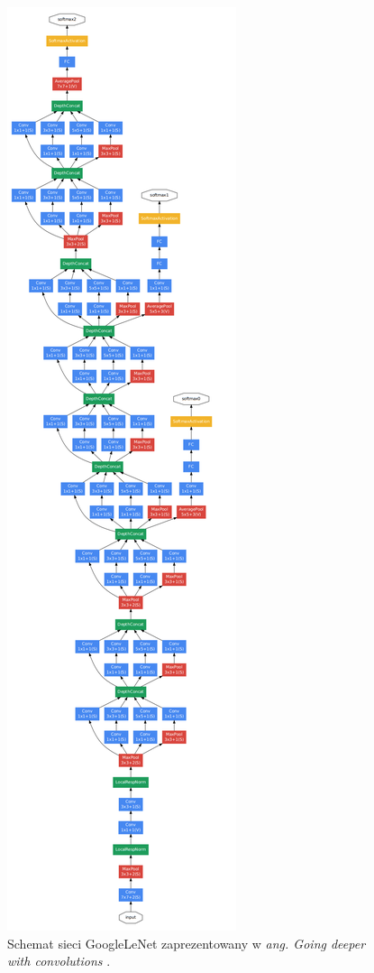 \begin{figure}[ht]
\centerline{\includegraphics[scale=0.4]{resources/inception/googleNet.png}}
\caption{Schemat sieci GoogleLeNet zaprezentowany w \textit{ang. Going deeper with convolutions} \cite{inceptionpaper}.} 
\label{fig:googleNet}
\end{figure}

